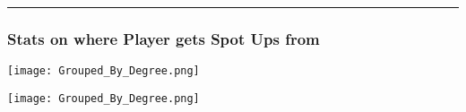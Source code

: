 \documentclass[a4paper,12pt]{article}
\begin{document}
\vspace{-1em} %
\hrule height 1pt width 1\textwidth %
\vspace{1 em} %

\subsubsection{Stats on where Player gets Spot Ups from}

\begin{table}[H]
    \centering
    \begin{minipage}[c]{0.45\textwidth} %
        \centering
        \texttt{[image: Grouped\_By\_Degree.png]} %
    \end{minipage}
    \hfill %
    \begin{minipage}[c]{0.45\textwidth} %
        \centering
        \texttt{[image: Grouped\_By\_Degree.png]} %
    \end{minipage}
\end{table}

\vspace{-1em} %
\vspace{-1em} %
\end{document}
